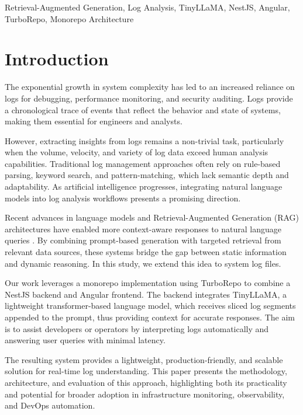 \documentclass[conference]{IEEEtran}
\begin{document}
\begin{IEEEkeywords}
Retrieval-Augmented Generation, Log Analysis, TinyLLaMA, NestJS, Angular, TurboRepo, Monorepo Architecture
\end{IEEEkeywords}

\section{Introduction}

The exponential growth in system complexity has led to an increased reliance on logs for debugging, performance monitoring, and security auditing. Logs provide a chronological trace of events that reflect the behavior and state of systems, making them essential for engineers and analysts.

However, extracting insights from logs remains a non-trivial task, particularly when the volume, velocity, and variety of log data exceed human analysis capabilities. Traditional log management approaches often rely on rule-based parsing, keyword search, and pattern-matching, which lack semantic depth and adaptability. As artificial intelligence progresses, integrating natural language models into log analysis workflows presents a promising direction.

Recent advances in language models and Retrieval-Augmented Generation (RAG) architectures have enabled more context-aware responses to natural language queries \cite{lewis2023ragqa}. By combining prompt-based generation with targeted retrieval from relevant data sources, these systems bridge the gap between static information and dynamic reasoning. In this study, we extend this idea to system log files.

Our work leverages a monorepo implementation using TurboRepo to combine a NestJS backend and Angular frontend. The backend integrates TinyLLaMA, a lightweight transformer-based language model, which receives sliced log segments appended to the prompt, thus providing context for accurate responses. The aim is to assist developers or operators by interpreting logs automatically and answering user queries with minimal latency.

The resulting system provides a lightweight, production-friendly, and scalable solution for real-time log understanding. This paper presents the methodology, architecture, and evaluation of this approach, highlighting both its practicality and potential for broader adoption in infrastructure monitoring, observability, and DevOps automation.
\end{document}
